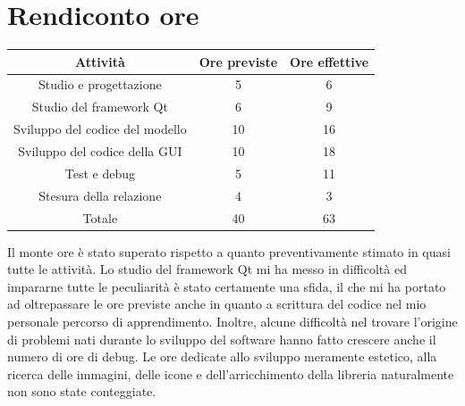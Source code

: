 \documentclass[10pt]{article}
\begin{document}
\section{Rendiconto ore}
\begin{center}
    \begin{tabular}{| c | c | c |} \hline
    Attività & Ore previste & Ore effettive \\\hline
    Studio e progettazione & 5 & 6 \\
    Studio del framework Qt & 6 & 9 \\
    Sviluppo del codice del modello & 10 & 16 \\
    Sviluppo del codice della GUI & 10 & 18 \\
    Test e debug & 5 & 11 \\
    Stesura della relazione & 4 & 3 \\\hline
    Totale & 40 & 63 \\\hline %
    \end{tabular}
\end{center}
Il monte ore è stato superato rispetto a quanto preventivamente stimato in quasi tutte le attività. Lo studio del framework Qt mi ha messo in difficoltà ed impararne tutte le peculiarità è stato certamente una sfida, il che mi ha portato ad oltrepassare le ore previste anche in quanto a scrittura del codice nel mio personale percorso di apprendimento. Inoltre, alcune difficoltà nel trovare l'origine di problemi nati durante lo sviluppo del software hanno fatto crescere anche il numero di ore di debug. Le ore dedicate allo sviluppo meramente estetico, alla ricerca delle immagini, delle icone e dell'arricchimento della libreria naturalmente non sono state conteggiate.
\end{document}
